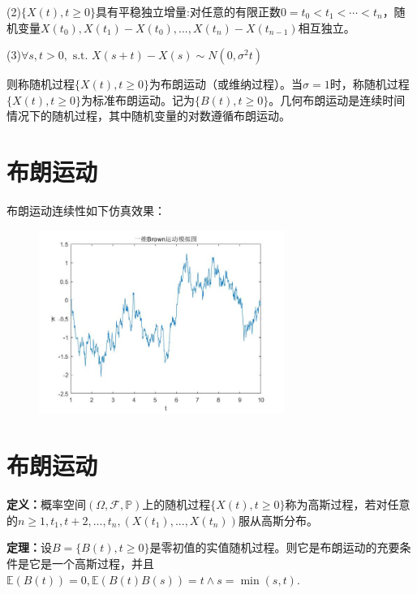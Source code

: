 \documentclass[UTF8]{ctexart}
\begin{document}
(2)$\{X(t),t\ge0\}$具有平稳独立增量:对任意的有限正数$0=t_0<t_1<\cdots<t_n$，随机变量$X(t_0),X(t_1)-X(t_0),...,X(t_n)-X(t_{n-1})$相互独立。

(3)$\forall s,t>0,\text{ s.t. } X(s+t)-X(s)\sim N(0,\sigma^2t)$

则称随机过程$\{X(t),t\ge0\}$为布朗运动（或维纳过程）。当$\sigma=1$时，称随机过程$\{X(t),t\ge0\}$为标准布朗运动。记为$\{B(t),t\ge0\}$。几何布朗运动是连续时间情况下的随机过程，其中随机变量的对数遵循布朗运动。


\section{布朗运动}
布朗运动连续性如下仿真效果：
\begin{figure}[H]
  \centering
  \includegraphics[width=8cm]{images/15.jpg}\\
  \caption{}\label{fig15}
\end{figure}



\section{布朗运动}
\textbf{定义：}概率空间$(\Omega,\mathcal{F},\mathbb{P})$上的随机过程$\{X(t),t\ge0\}$称为高斯过程，若对任意的$n\ge1,t_1,t+2,...,t_n,(X(t_1),...,X(t_n))$服从高斯分布。

\textbf{定理：}设$B=\{B(t),t\ge0\}$是零初值的实值随机过程。则它是布朗运动的充要条件是它是一个高斯过程，并且$\mathbb{E}(B(t))=0,\mathbb{E}(B(t)B(s))=t\wedge s=\min(s,t).$
\end{document}
